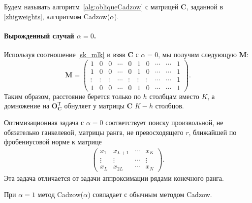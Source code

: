 \documentclass[12pt,a4paper,fleqn,leqno]{article}
\newcommand{\rmT}{\mathrm{T}}
\newcommand{\bfC}{\mathbf{C}}
\newcommand{\bfM}{\mathbf{M}}
\newcommand{\bfO}{\mathbf{O}}
\newcommand{\be}{\begin{eqnarray}}
\newcommand{\ee}{\end{eqnarray}}
\begin{document}
Будем называть алгоритм~\ref{alg:obliqueCadzow} с матрицей $\bfC$, заданной в \eqref{zhigweights}, алгоритмом Cadzow($\alpha$).

\paragraph{Вырожденный случай $\alpha=0$.}

Используя соотношение \eqref{sk_mlk} и взяв $\bfC$ с $\alpha=0$, мы получим следующую $\bfM$:
\begin{equation*}
\bfM = \begin{pmatrix}
1 & 0 & 0 & \cdots & 0 & 1 & 0 & \cdots & \cdots & 1 \\
1 & 0 & 0 & \cdots & 0 & 1 & 0 & \cdots & \cdots & 1 \\
\vdots & \vdots & \vdots & \cdots & \vdots & \vdots & \vdots & \cdots & \cdots & 1 \\
1 & 0 & 0 & \cdots & 0 & 1 & 0 & \cdots & \cdots & 1
\end{pmatrix}.
\end{equation*}
Таким образом, расстояние берется только по $h$ столбцам вместо $K$, а домножение на $\bfO_\bfC^{\rmT}$ обнуляет у матрицы $\bfC$ $K - h$ столбцов.

\begin{remark}
Оптимизационная задача с $\alpha=0$ соответствует поиску произвольной, не обязательно ганкелевой, матрицы ранга, не превосходящего $r$,
ближайшей по фробениусовой норме к матрице
\be
\label{eq:traj_noinersect}
\begin{pmatrix}
x_1&x_{L+1}&\cdots&x_{K}\\
\vdots&\vdots&\cdots&\vdots\\
x_L&x_{2L}&\cdots&x_N
\end{pmatrix}.
\ee
Эта задача отличается от задачи аппроксимации рядами конечного ранга.

При $\alpha=1$ метод Cadzow($\alpha$) совпадает с обычным методом Cadzow.

\end{remark}
\end{document}
